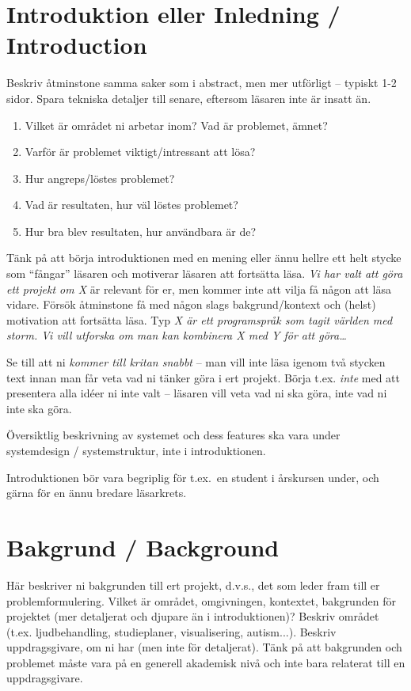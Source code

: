 \documentclass[a4paper,12pt]{article}
\begin{document}
\newpage %

\section{Introduktion eller Inledning / Introduction}
Beskriv åtminstone samma saker som i abstract, men mer utförligt -- typiskt 1-2 sidor. Spara tekniska detaljer till senare, eftersom läsaren inte är insatt än.

\begin{enumerate}
\item Vilket är området ni arbetar inom? Vad är problemet, ämnet? 
\item Varför är problemet viktigt/intressant att lösa?
\item Hur angreps/löstes problemet? 
\item Vad är resultaten, hur väl löstes problemet?
\item Hur bra blev resultaten, hur användbara är de?
\end{enumerate}

Tänk på att börja introduktionen med en mening eller ännu hellre ett helt stycke som ``fångar'' läsaren och motiverar läsaren att fortsätta läsa.  \emph{Vi har valt att göra ett projekt om X} är relevant för er, men kommer inte att vilja få någon att läsa vidare.  Försök åtminstone få med någon slags bakgrund/kontext och (helst) motivation att fortsätta läsa.  Typ \emph{X är ett programspråk som tagit världen med storm.  Vi vill utforska om man kan kombinera X med Y för att göra\ldots}

Se till att ni \emph{kommer till kritan snabbt} – man vill inte läsa igenom två stycken text innan man får veta vad ni tänker göra i ert projekt.  Börja t.ex. \emph{inte} med att presentera alla idéer ni inte valt – läsaren vill veta vad ni ska göra, inte vad ni inte ska göra.

Översiktlig beskrivning av systemet och dess features ska vara under systemdesign / systemstruktur, inte i introduktionen.

Introduktionen bör vara begriplig för t.ex.~en student i årskursen under, och gärna för en ännu bredare läsarkrets.

\section{Bakgrund / Background}
Här beskriver ni bakgrunden till ert projekt, d.v.s., det som leder fram till er problemformulering.  Vilket är området, omgivningen, kontextet, bakgrunden för projektet (mer detaljerat och djupare än i introduktionen)?  Beskriv området (t.ex. ljudbehandling, studieplaner, visualisering, autism...).  Beskriv uppdragsgivare, om ni har (men inte för detaljerat).  Tänk på att bakgrunden och problemet måste vara på en generell akademisk nivå och inte bara relaterat till en uppdragsgivare.
\end{document}
